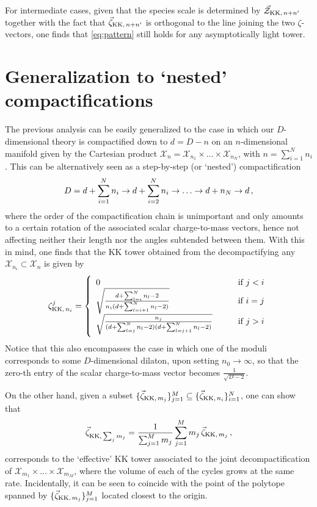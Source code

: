 For intermediate cases, given that the species scale is determined by $\vec{\mathcal{Z}}_{{\rm KK},\, n+n'}$ together with the fact that $\vec{\zeta}_{{\rm KK},\, n+n'}$ is orthogonal to the line joining the two $\zeta$-vectors, one finds that \eqref{eq:pattern} still holds for any asymptotically light tower.
	
\section{Generalization to `nested' compactifications}
\label{ss:nestedcompactifications}	
	
The previous analysis can be easily generalized to the case in which our $D$-dimensional theory is compactified down to $d=D-n$ on an $n$-dimensional manifold given by the Cartesian product $\mathcal{X}_n=\mathcal{X}_{n_1}\times \ldots \times\mathcal{X}_{n_N}$, with $n=\sum_{i=1}^N n_i$. This can be alternatively seen as a step-by-step (or `nested') compactification
%
\begin{equation}\label{eq:compactchain}
	\notag D=d+\sum_{i=1}^N n_i\to d+\sum_{i=2}^N n_i\to \ldots \to d+n_N\to d\, ,
\end{equation}
%
where the order of the compactification chain is unimportant and only amounts to a certain rotation of the associated scalar charge-to-mass vectors, hence not affecting neither their length nor the angles subtended between them. With this in mind, one finds that the KK tower obtained from the decompactifying any $\mathcal{X}_{n_i} \subset \mathcal{X}_n$ is given by
%
\begin{equation}\label{eq: gen eq}
	\zeta^j_{{\rm KK},\, n_i}=\left\{
	\begin{array}{ll}
		0& \qquad \text{if }j<i\\
		\sqrt{\frac{d+\sum_{l=i}^Nn_l-2}{n_i(d+\sum_{l=i+1}^Nn_l-2)}}& \qquad \text{if }i=j\\
		\sqrt{\frac{n_j}{(d+\sum_{l=j}^Nn_l-2)(d+\sum_{l=j+1}^Nn_l-2)}}& \qquad \text{if }j>i
	\end{array}
	\right.
\end{equation} 
%
Notice that this also encompasses the case in which one of the moduli corresponds to some $D$-dimensional dilaton, upon setting $n_0\to \infty$, so that the zero-th entry of the scalar charge-to-mass vector becomes $\frac{1}{\sqrt{D-2}}$.
	
On the other hand, given a subset $\{\vec{\zeta}_{{\rm KK},\, m_j}\}_{j=1}^M\subseteq \{\vec{\zeta}_{{\rm KK},\, n_i}\}_{i=1}^N$, one can show that
%
\begin{equation}\label{eq: mult decompact}
	\vec{\zeta}_{{\rm KK},\, \sum_j m_j}=\frac{1}{\sum_{j=1}^M m_j}\sum_{j=1}^M m_j\, \vec{\zeta}_{{\rm KK},\, m_j}\, ,
\end{equation}
%
corresponds to the `effective' KK tower associated to the joint decompactification of $\mathcal{X}_{m_1}\times \ldots \times \mathcal{X}_{m_M}$, where the volume of each of the cycles grows at the same rate. Incidentally, it can be seen to coincide with the point of the polytope spanned by $\{\vec{\zeta}_{{\rm KK},\, m_j}\}_{j=1}^M$ located closest to the origin.
	
